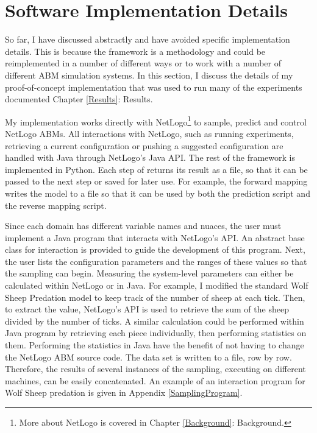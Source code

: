 \section{Software Implementation Details}
So far, I have discussed \fw abstractly and have avoided specific implementation details.
This is because the framework is a methodology and could be reimplemented in a number of different ways or to work with a number of different ABM simulation systems.
In this section, I discuss the details of my proof-of-concept implementation that was used to run many of the experiments documented Chapter \ref{Results}: Results.

My implementation works directly with NetLogo\footnote{More about NetLogo is covered in Chapter \ref{Background}: Background.} to sample, predict and control NetLogo ABMs.
All interactions with NetLogo, such as running experiments, retrieving a current configuration or pushing a suggested configuration are handled with Java through NetLogo's Java API.
The rest of the framework is implemented in Python.
Each step of \fw returns its result as a file, so that it can be passed to the next step or saved for later use.
For example, the forward mapping writes the model to a file so that it can be used by both the prediction script and the reverse mapping script.

Since each domain has different variable names and nuaces, the user must implement a Java program that interacts with NetLogo's API.
An abstract base class for interaction is provided to guide the development of this program.
Next, the user lists the configuration parameters and the ranges of these values so that the sampling can begin.
Measuring the system-level parameters can either be calculated within NetLogo or in Java.
For example, I modified the standard Wolf Sheep Predation model to keep track of the number of sheep at each tick.
Then, to extract the value, NetLogo's API is used to retrieve the sum of the sheep divided by the number of ticks.
A similar calculation could be performed within Java program by retrieving each piece individually, then performing statistics on them.
Performing the statistics in Java have the benefit of not having to change the NetLogo ABM source code.
The data set is written to a file, row by row.
Therefore, the results of several instances of the sampling, executing on different machines, can be easily concatenated.
An example of an interaction program for Wolf Sheep predation is given in Appendix \ref{SamplingProgram}.


